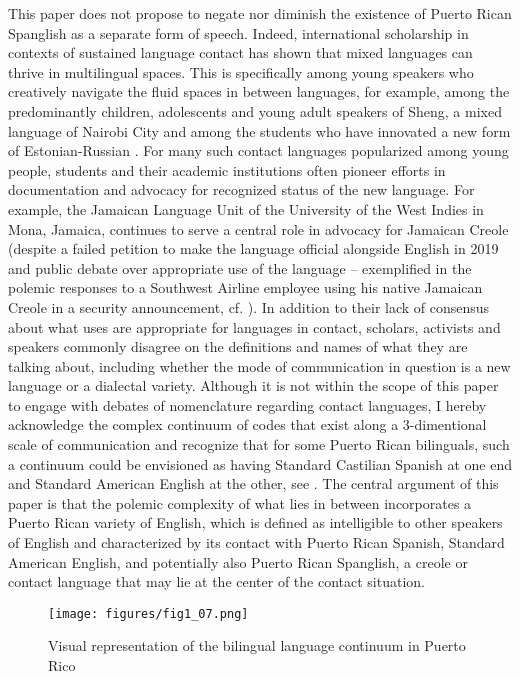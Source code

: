 \documentclass[output=paper,colorlinks,citecolor=brown]{langscibook}
\begin{document}
This paper does not propose to negate nor diminish the existence of Puerto Rican Spanglish as a separate form of speech. Indeed, international scholarship in contexts of sustained language contact has shown that mixed languages can thrive in multilingual spaces. This is specifically among young speakers who creatively navigate the fluid spaces in between languages, for example, among the predominantly children, adolescents and young adult speakers of Sheng, a mixed language of Nairobi City \citep[176]{Githiora2002} and among the students who have innovated a new form of Estonian-Russian \citep{Zabrodskaja_2013}. For many such contact languages popularized among young people, students and their academic institutions often pioneer efforts in documentation and advocacy for recognized status of the new language. For example, the Jamaican Language Unit of the University of the West Indies in Mona, Jamaica, continues to serve a central role in advocacy for Jamaican Creole (despite a failed petition to make the language official alongside English in 2019 and public debate over appropriate use of the language -- exemplified in the polemic responses to a Southwest Airline employee using his native Jamaican Creole in a security announcement, cf. \cite{Dawkins_2020}). In addition to their lack of consensus about what uses are appropriate for languages in contact, scholars, activists and speakers commonly disagree on the definitions and names of what they are talking about, including whether the mode of communication in question is a new language or a dialectal variety. Although it is not within the scope of this paper to engage with debates of nomenclature regarding contact languages, I hereby acknowledge the complex continuum of codes that exist along a 3-dimentional scale of communication and recognize that for some Puerto Rican bilinguals, such a continuum could be envisioned as having Standard Castilian Spanish at one end and Standard American English at the other, see . The central argument of this paper is that the polemic complexity of what lies in between incorporates a Puerto Rican variety of English, which is defined as intelligible to other speakers of English and characterized by its contact with Puerto Rican Spanish, Standard American English, and potentially also Puerto Rican Spanglish, a creole or contact language that may lie at the center of the contact situation.

\begin{figure}
    \texttt{[image: figures/fig1\_07.png]}
    \caption{Visual representation of the bilingual language continuum in Puerto Rico}
    \label{fig:fig1_07}
\end{figure}
\end{document}

